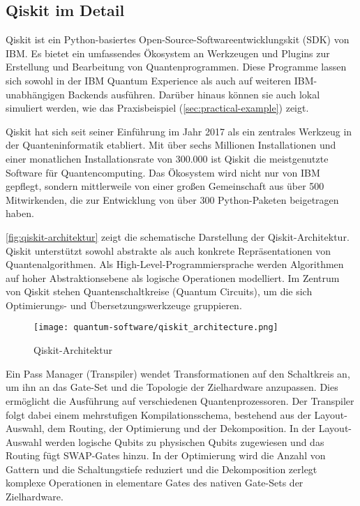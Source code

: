 \subsection{Qiskit im Detail}
\label{sec:qiskit-details}

Qiskit ist ein Python-basiertes Open-Source-Softwareentwicklungskit (SDK) von IBM. Es bietet ein umfassendes Ökosystem an Werkzeugen und Plugins zur Erstellung und Bearbeitung von Quantenprogrammen. Diese Programme lassen sich sowohl in der IBM Quantum Experience als auch auf weiteren IBM-unabhängigen Backends ausführen. \autocite{singhSurveyAvailableTools2024a} Darüber hinaus können sie auch lokal simuliert werden, wie das Praxisbeispiel (\autoref{sec:practical-example}) zeigt. 

Qiskit hat sich seit seiner Einführung im Jahr 2017 als ein zentrales Werkzeug in der Quanteninformatik etabliert. Mit über sechs Millionen Installationen und einer monatlichen Installationsrate von 300.000 ist Qiskit die meistgenutzte Software für Quantencomputing. Das Ökosystem wird nicht nur von IBM gepflegt, sondern mittlerweile von einer großen Gemeinschaft aus über 500 Mitwirkenden, die zur Entwicklung von über 300 Python-Paketen beigetragen haben. \autocite{javadi-abhariQuantumComputingQiskit2024a}

\autoref{fig:qiskit-architektur} zeigt die schematische Darstellung der Qiskit-Architektur. Qiskit unterstützt sowohl abstrakte als auch konkrete Repräsentationen von Quantenalgorithmen. Als High-Level-Programmiersprache werden Algorithmen auf hoher Abstraktionsebene als logische Operationen modelliert. Im Zentrum von Qiskit stehen Quantenschaltkreise (Quantum Circuits), um die sich Optimierungs- und Übersetzungswerkzeuge gruppieren. \autocite{javadi-abhariQuantumComputingQiskit2024a}

\begin{figure}[H]
    \centering
    \texttt{[image: quantum-software/qiskit\_architecture.png]}
    \caption{Qiskit-Architektur \autocite{javadi-abhariQuantumComputingQiskit2024a}}
    \label{fig:qiskit-architektur}
\end{figure}

Ein Pass Manager (Transpiler) wendet Transformationen auf den Schaltkreis an, um ihn an das Gate-Set und die Topologie der Zielhardware anzupassen. Dies ermöglicht die Ausführung auf verschiedenen Quantenprozessoren. Der Transpiler folgt dabei einem mehrstufigen Kompilationsschema, bestehend aus der Layout-Auswahl, dem Routing, der Optimierung und der Dekomposition. In der Layout-Auswahl werden logische Qubits zu physischen Qubits zugewiesen und das Routing fügt SWAP-Gates hinzu. In der Optimierung wird die Anzahl von Gattern und die Schaltungstiefe reduziert und die Dekomposition zerlegt komplexe Operationen in elementare Gates des nativen Gate-Sets der Zielhardware. \autocite{javadi-abhariQuantumComputingQiskit2024a}

